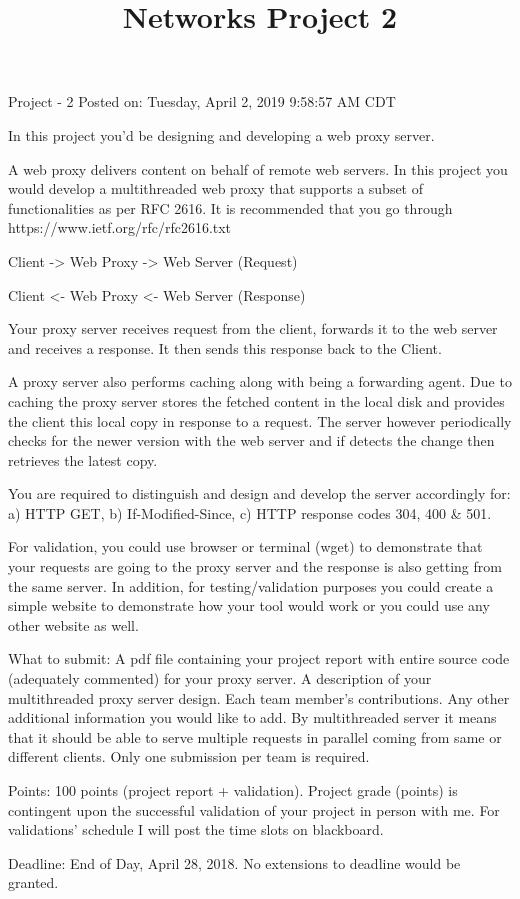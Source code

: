 \documentclass[11pt]{article}
\title{Networks Project 2}
\author{}
\date{}
\begin{document}
\maketitle

Project - 2
Posted on: Tuesday, April 2, 2019 9:58:57 AM CDT

In this project you'd be designing and developing a web proxy server. 

A web proxy delivers content on behalf of remote web servers. In this project you would develop a multithreaded web proxy that supports a subset of functionalities as per RFC 2616. It is recommended that you go through https://www.ietf.org/rfc/rfc2616.txt

Client -> Web Proxy -> Web Server (Request)

Client <- Web Proxy <- Web Server (Response)

Your proxy server receives request from the client, forwards it to the web server and receives a response. It then sends this response back to the Client. 

A proxy server also performs caching along with being a forwarding agent. Due to caching the proxy server stores the fetched content in the local disk and provides the client this local copy in response to a request. The server however periodically checks for the newer version with the web server and if detects the change then retrieves the latest copy. 

You are required to distinguish and design and develop the server accordingly for: a) HTTP GET, b)  If-Modified-Since, c) HTTP response codes 304, 400 \& 501.

For validation, you could use browser or terminal (wget) to demonstrate that your requests are going to the proxy server and the response is also getting from the same server. In addition, for testing/validation purposes you could create a simple website to demonstrate how your tool would work or you could use any other website as well.

What to submit: A pdf file containing your project report with entire source code (adequately commented) for your proxy server. A description of your multithreaded proxy server design. Each team member's contributions. Any other additional information you would like to add. By multithreaded server it means that it should be able to serve multiple requests in parallel coming from same or different clients. Only one submission per team is required. 

Points: 100 points (project report + validation). Project grade (points) is contingent upon the successful validation of your project in person with me. For validations' schedule I will post the time slots on blackboard. 

Deadline: End of Day, April 28, 2018. No extensions to deadline would be granted. 
\end{document}
